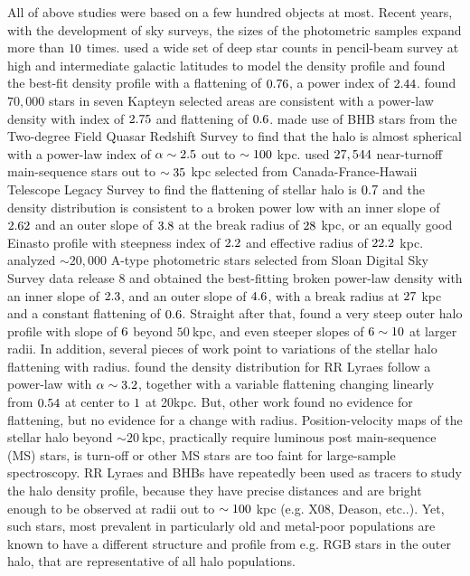 \documentclass[12pt,preprint]{aastex}
\begin{document}
All of above studies were based on a few hundred objects at most. Recent years, with the development of sky surveys, the sizes of the photometric samples expand more than $\rm 10$ times. \citet{Robin2000} used a wide set of deep star counts in pencil-beam survey at high and intermediate galactic latitudes to model the density profile and found the best-fit density profile with a flattening of $\rm 0.76$, a power index of $\rm 2.44$. \citet{Siegel2002} found $70,000$ stars in seven Kapteyn selected areas are consistent with a power-law density with index of $\rm 2.75$ and flattening of $\rm 0.6$. \citet{Propris2010} made use of BHB stars from the Two-degree Field Quasar Redshift Survey to find that the halo is almost spherical with a power-law index of $\rm \alpha \sim 2.5$ out to $\rm \sim 100~$kpc. \citet{Sesar2011} used $\rm 27,544$ near-turnoff main-sequence stars out to $\rm \sim 35~$kpc selected from Canada-France-Hawaii Telescope Legacy Survey to find the flattening of stellar halo is $\rm 0.7$ and the density distribution is consistent to a broken power low with an inner slope of $\rm 2.62$ and an outer slope of $\rm 3.8$ at the break radius of $\rm 28~$kpc, or an equally good Einasto profile\citep{Einasto1989} with steepness index of $\rm 2.2$ and effective radius of $\rm 22.2~$kpc. \citet{Deason2011} analyzed $\sim 20,000$ A-type photometric stars selected from Sloan Digital Sky Survey data release 8\citep{Ahn2012} and obtained the best-fitting broken power-law density with an inner slope of $\rm 2.3$, and an outer slope of $\rm 4.6$, with a break radius at $\rm 27~$kpc and a constant flattening of $\rm 0.6$. Straight after that, \citet{Deason2014} found a very steep outer halo profile with slope of $\rm 6$ beyond $50~$kpc, and even steeper slopes of $\rm 6\sim10$ at larger radii.
In addition, several pieces of work point to variations of the stellar halo flattening with radius. \citet{Preston1991} found the density distribution for RR Lyraes follow a power-law with $\rm \alpha \sim 3.2$, together with a variable flattening changing linearly from $\rm 0.54$ at center to $\rm 1$ at 20kpc. But, other work \citep{Sluis1998, Sesar2011,Deason2011} found no evidence for flattening, but no evidence for a change with radius.
Position-velocity maps of the stellar halo beyond $\sim 20~$kpc, practically require luminous
post main-sequence (MS) stars, is turn-off or other MS stars are too faint for large-sample spectroscopy. RR Lyraes and BHBs have repeatedly been used as tracers to study the halo density profile, because they have precise distances and are bright enough to be observed at radii out to $\rm \sim 100~$kpc (e.g. X08, Deason, etc..). Yet, such stars, most prevalent in particularly old and metal-poor populations\citep{Bell08, Xue2011} are known to have a different structure and profile from e.g. RGB stars in the outer halo, that are representative of all halo populations.
\end{document}
